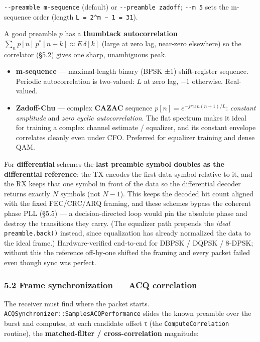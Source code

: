 \documentclass[
  10pt,
]{article}
\providecommand{\tightlist}{%
  \setlength{\itemsep}{0pt}\setlength{\parskip}{0pt}}
\begin{document}
\texttt{-\/-preamble\ m-sequence} (default) or
\texttt{-\/-preamble\ zadoff}; \texttt{-\/-m\ 5} sets the m-sequence
order (length \texttt{L\ =\ 2\^{}m\ −\ 1\ =\ 31}).

A good preamble \(p\) has a \textbf{thumbtack autocorrelation}
\(\sum_n p[n]\,p^{*}[n+k] \approx E\,\delta[k]\) (large at zero lag,
near-zero elsewhere) so the correlator (§5.2) gives one sharp,
unambiguous peak.

\begin{itemize}
\tightlist
\item
  \textbf{m-sequence} --- maximal-length binary (BPSK ±1) shift-register
  sequence. Periodic autocorrelation is two-valued: \(L\) at zero lag,
  \(-1\) otherwise. Real-valued.
\item
  \textbf{Zadoff-Chu} --- complex \textbf{CAZAC} sequence
  \(p[n] = e^{-j\pi u\, n(n+1)/L}\): \emph{constant amplitude} and
  \emph{zero cyclic autocorrelation}. The flat spectrum makes it ideal
  for training a complex channel estimate / equalizer, and its constant
  envelope correlates cleanly even under CFO. Preferred for equalizer
  training and dense QAM.
\end{itemize}

For \textbf{differential} schemes the \textbf{last preamble symbol
doubles as the differential reference}: the TX encodes the first data
symbol relative to it, and the RX keeps that one symbol in front of the
data so the differential decoder returns exactly \(N\) symbols (not
\(N-1\)). This keeps the decoded bit count aligned with the fixed
FEC/CRC/ARQ framing, and these schemes bypass the coherent phase PLL
(§5.5) --- a decision-directed loop would pin the absolute phase and
destroy the transitions they carry. (The equalizer path prepends the
\emph{ideal} \texttt{preamble.back()} instead, since equalization has
already normalized the data to the ideal frame.) Hardware-verified
end-to-end for DBPSK / DQPSK / 8-DPSK; without this the reference
off-by-one shifted the framing and every packet failed even though sync
was perfect.

\hypertarget{52-frame-synchronization--acq-correlation}{%
\subsubsection{5.2 Frame synchronization --- ACQ
correlation}\label{52-frame-synchronization--acq-correlation}}

The receiver must find where the packet starts.
\texttt{ACQSynchronizer::SamplesACQPerformance} slides the known
preamble over the burst and computes, at each candidate offset τ (the
\texttt{ComputeCorrelation} routine), the \textbf{matched-filter /
cross-correlation} magnitude:
\end{document}
